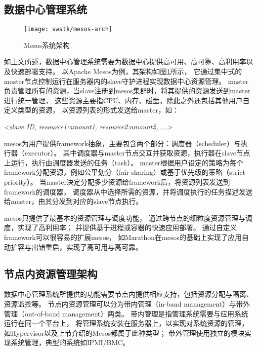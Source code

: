 \subsection{数据中心管理系统}

\begin{figure}[tb]
  \centering
  \texttt{[image: swstk/mesos-arch]}
  \caption{Mesos系统架构}
  \label{fig:mesos-arch}
\end{figure}

如上文所述，数据中心管理系统需要为数据中心提供高可用、高可靠、高利用率以及快速部署支持。
以Apache Mesos\cite{Hindman:2011:Mesos}为例，其架构如图\ref{fig:mesos-arch}所示，
它通过集中式的master节点控制运行在服务器内的slave守护进程实现数据中心资源管理。
master负责管理所有的资源，当slave注册到mesos集群时，将其提供的资源发送到master进行统一管理，
这些资源主要指CPU、内存、磁盘，除此之外还包括其他用户自定义类型的资源，
以资源列表的形式发送给master，如：

\textit{<slave ID, resource1:amount1, resource2:amount2, ...>}

mesos为用户提供framework抽象，主要包含两个部分：调度器（scheduler）与执行器（executor）。
其中调度器与master节点交互并获取资源，执行器在slave节点上运行，执行由调度器发送的任务（task）。
master根据用户设定的策略为每个framework分配资源，例如公平划分（fair sharing）或基于优先级的策略（strict priority）。
当master决定分配多少资源给framework后，将资源列表发送到framework的调度器，
调度器从中选择所需的资源，并将调度执行的任务描述发送给master，由其分发到对应的slave节点执行。

mesos只提供了最基本的资源管理与调度功能，
通过跨节点的细粒度资源管理与调度，实现了高利用率；
并提供基于进程或容器的快速应用部署。
通过自定义framework可以很容易的扩展mesos，
如Marathon\cite{}在mesos的基础上实现了应用自动扩容与出错重启，实现了高可用与高可靠。


\subsection{节点内资源管理架构}

数据中心管理系统所提供的功能需要节点内提供相应支持，包括资源分配与隔离、资源监控等。
节点内资源管理可以分为带内管理（in-band management）与带外管理（out-of-band management）两类。
带内管理是指管理系统需要与应用系统运行在同一个平台上，
将管理系统安装在服务器上，以实现对系统资源的管理，
如Hypervisor以及上节介绍的Mesos都属于此种类型；
带外管理使用独立的模块实现系统管理，典型的系统如IPMI/BMC。

